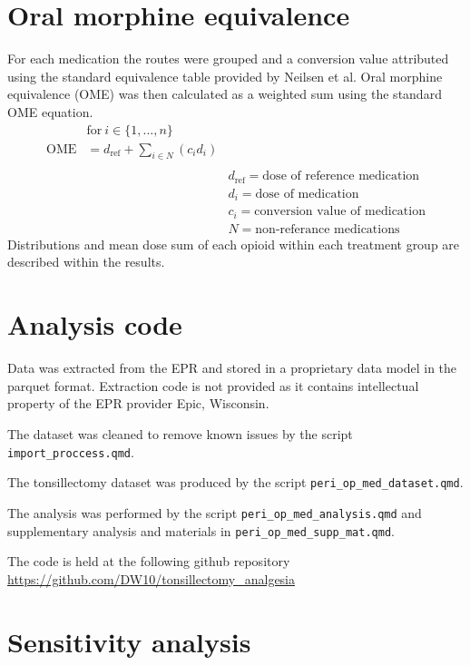 \documentclass[
  letterpaper,
  DIV=11,
  numbers=noendperiod]{scrreprt}
\begin{document}
\section{Oral morphine equivalence}\label{sec-sm-ome}

For each medication the routes were grouped and a conversion value
attributed using the standard equivalence table provided by Neilsen et
al. Oral morphine equivalence (OME) was then calculated as a weighted
sum using the standard OME equation. \[
\begin{aligned}
&\text{for}\  i \in \{1,...,n\}\\
\text{OME} &= d_{\text{ref}} + \sum_{i \in N} (c_i  d_i)\\
\\
&&d_{\text{ref}} = \text{dose of reference medication} \\
&&d_{i} = \text{dose of medication} \\
&&c_{i} = \text{conversion value of medication} \\
&&{N} = \text{non-referance medications}
\end{aligned}
\] Distributions and mean dose sum of each opioid within each treatment
group are described within the results.

\section{Analysis code}\label{sec-sm-analysis-code}

Data was extracted from the EPR and stored in a proprietary data model
in the parquet format. Extraction code is not provided as it contains
intellectual property of the EPR provider Epic, Wisconsin.

The dataset was cleaned to remove known issues by the script
\texttt{import\_proccess.qmd}.

The tonsillectomy dataset was produced by the script
\texttt{peri\_op\_med\_dataset.qmd}.

The analysis was performed by the script
\texttt{peri\_op\_med\_analysis.qmd} and supplementary analysis and
materials in \texttt{peri\_op\_med\_supp\_mat.qmd}.

The code is held at the following github repository
\url{https://github.com/DW10/tonsillectomy_analgesia}

\section{Sensitivity analysis}\label{sec-sm-sensitivity}
\end{document}
